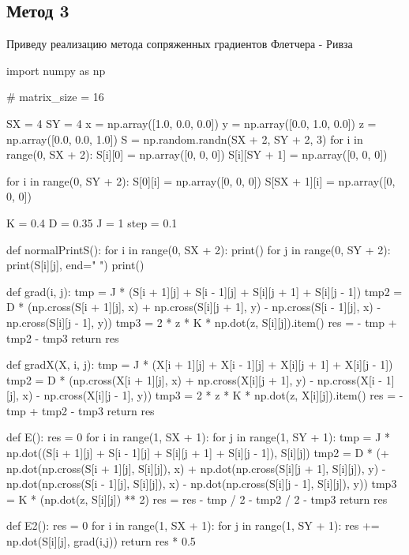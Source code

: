 \documentclass[ 12pt,x11names]{article}
\begin{document}
\subsection{Метод 3}
 Приведу реализацию метода сопряженных градиентов Флетчера - Ривза
 \begin{python}
import numpy as np

# matrix_size = 16


SX = 4
SY = 4
x = np.array([1.0, 0.0, 0.0])
y = np.array([0.0, 1.0, 0.0])
z = np.array([0.0, 0.0, 1.0])
S = np.random.randn(SX + 2, SY + 2, 3)
for i in range(0, SX + 2):
    S[i][0] = np.array([0, 0, 0])
    S[i][SY + 1] = np.array([0, 0, 0])

for i in range(0, SY + 2):
    S[0][i] = np.array([0, 0, 0])
    S[SX + 1][i] = np.array([0, 0, 0])

K = 0.4
D = 0.35
J = 1
step = 0.1

def normalPrintS():
    for i in range(0, SX + 2):
        print()
        for j in range(0, SY + 2):
            print(S[i][j], end=" ")
    print()


def grad(i, j):
    tmp = J * (S[i + 1][j] + S[i - 1][j] +
               S[i][j + 1] + S[i][j - 1])
    tmp2 = D * (np.cross(S[i + 1][j], x)
               + np.cross(S[i][j + 1], y)
               - np.cross(S[i - 1][j], x)
               - np.cross(S[i][j - 1], y))
    tmp3 = 2 * z * K * np.dot(z, S[i][j]).item()
    res = - tmp + tmp2 - tmp3
    return res

def gradX(X, i, j):
    tmp = J * (X[i + 1][j] + X[i - 1][j]
             + X[i][j + 1] + X[i][j - 1])
    tmp2 = D * (np.cross(X[i + 1][j], x)
        + np.cross(X[i][j + 1], y)
        - np.cross(X[i - 1][j], x)
        - np.cross(X[i][j - 1], y))
        tmp3 = 2 * z * K * np.dot(z, X[i][j]).item()
    res = - tmp + tmp2 - tmp3
    return res



def E():
    res = 0
    for i in range(1, SX + 1):
        for j in range(1, SY + 1):
            tmp = J * np.dot((S[i + 1][j] + S[i - 1][j]
            + S[i][j + 1] + S[i][j - 1]), S[i][j])
            tmp2 = D * (+ np.dot(np.cross(S[i + 1][j], S[i][j]), x)
                        + np.dot(np.cross(S[i][j + 1], S[i][j]), y)
                        - np.dot(np.cross(S[i - 1][j], S[i][j]), x)
                        - np.dot(np.cross(S[i][j - 1], S[i][j]), y))
            tmp3 = K * (np.dot(z, S[i][j]) ** 2)
            res = res - tmp / 2 - tmp2 / 2 - tmp3
    return res

def E2():
    res = 0
    for i in range(1, SX + 1):
        for j in range(1, SY + 1):
            res += np.dot(S[i][j], grad(i,j))
    return res * 0.5


\end{python}
\end{document}
